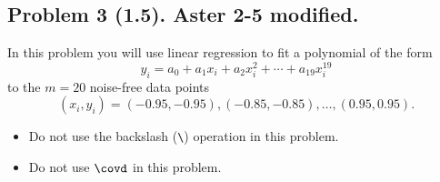 \documentclass[11pt,titlepage,fleqn]{article}
\begin{document}

\subsection*{Problem 3 (1.5). Aster 2-5 modified.}

In this problem you will use linear regression to fit a polynomial of the form
%
\begin{equation}
y_i = a_0 + a_1x_i + a_2x_i^2 + \cdots + a_{19}x_i^{19}
\label{yi}
\end{equation}
%
to the $m=20$ noise-free data points
%
\begin{equation*}
(x_i,y_i) = (-0.95,-0.95), (-0.85,-0.85), \ldots, (0.95,0.95).
\end{equation*}
%
\begin{itemize}
\item Do not use the backslash (\verb+\+) operation in this problem.

\item Do not use $\covd$ in this problem.
\end{itemize}

\end{document}
